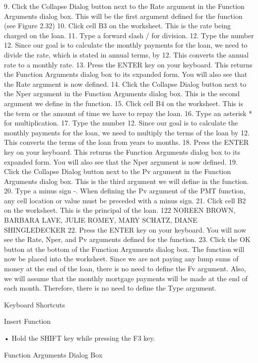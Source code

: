 9. Click the Collapse Dialog button next to the Rate argument in the Function Arguments dialog
box. This will be the first argument defined for the function (see Figure 2.32)
10. Click cell B3 on the worksheet. This is the rate being charged on the loan.
11. Type a forward slash / for division.
12. Type the number 12. Since our goal is to calculate the monthly payments for the loan, we need
to divide the rate, which is stated in annual terms, by 12. This converts the annual rate to a
monthly rate.
13. Press the ENTER key on your keyboard. This returns the Function Arguments dialog box to its
expanded form. You will also see that the Rate argument is now defined.
14. Click the Collapse Dialog button next to the Nper argument in the Function Arguments dialog
box. This is the second argument we define in the function.
15. Click cell B4 on the worksheet. This is the term or the amount of time we have to repay the loan.
16. Type an asterisk * for multiplication.
17. Type the number 12. Since our goal is to calculate the monthly payments for the loan, we need
to multiply the terms of the loan by 12. This converts the terms of the loan from years to
months.
18. Press the ENTER key on your keyboard. This returns the Function Arguments dialog box to its
expanded form. You will also see that the Nper argument is now defined.
19. Click the Collapse Dialog button next to the Pv argument in the Function Arguments dialog
box. This is the third argument we will define in the function.
20. Type a minus sign -. When defining the Pv argument of the PMT function, any cell location or
value must be preceded with a minus sign.
21. Click cell B2 on the worksheet. This is the principal of the loan.
122 NOREEN BROWN, BARBARA LAVE, JULIE ROMEY, MARY SCHATZ, DIANE SHINGLEDECKER
22. Press the ENTER key on your keyboard. You will now see the Rate, Nper, and Pv arguments
defined for the function.
23. Click the OK button at the bottom of the Function Arguments dialog box. The function will
now be placed into the worksheet. Since we are not paying any lump sums of money at the end
of the loan, there is no need to define the Fv argument. Also, we will assume that the monthly
mortgage payments will be made at the end of each month. Therefore, there is no need to define
the Type argument.


Keyboard Shortcuts


Insert Function

• Hold the SHIFT key while pressing the F3 key.

Function Arguments Dialog Box


